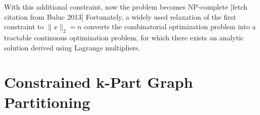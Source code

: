 With this additional constraint, now the problem becomes NP-complete [fetch citation from Buluc 2013]
Fortunately, a widely used relaxation of the first constraint to
$\| x \|_2 = n$ converts the combinatorial optimization problem into a
tractable continuous optimization problem, for which there exists an
analytic solution derived using Lagrange multipliers.



\section{Constrained k-Part Graph Partitioning}

